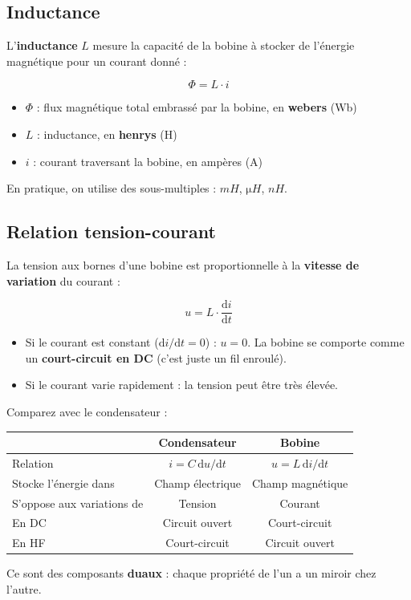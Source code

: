 \documentclass[12pt,a4paper,twoside]{book}
\begin{document}
\subsection{Inductance}

L'\textbf{inductance} $L$ mesure la capacité de la bobine à stocker de l'énergie magnétique pour un courant donné :

\begin{formule}
\[
\boxed{\Phi = L \cdot i}
\]
\begin{itemize}[nosep]
\item $\Phi$ : flux magnétique total embrassé par la bobine, en \textbf{webers} (Wb)
\item $L$ : inductance, en \textbf{henrys} (H)
\item $i$ : courant traversant la bobine, en ampères (A)
\end{itemize}
\vspace{0.2cm}
En pratique, on utilise des sous-multiples : $\si{mH}$, $\si{\micro H}$, $\si{nH}$.
\end{formule}

\subsection{Relation tension-courant}

La tension aux bornes d'une bobine est proportionnelle à la \textbf{vitesse de variation} du courant :

\begin{formule}
\[
\boxed{u = L \cdot \frac{\mathrm{d}i}{\mathrm{d}t}}
\]
\begin{itemize}[nosep]
\item Si le courant est constant ($\mathrm{d}i/\mathrm{d}t = 0$) : $u = 0$. La bobine se comporte comme un \textbf{court-circuit en DC} (c'est juste un fil enroulé).
\item Si le courant varie rapidement : la tension peut être très élevée.
\end{itemize}
\end{formule}

\begin{intuition}
Comparez avec le condensateur :
\begin{center}
\begin{tabular}{lcc}
\toprule
 & \textbf{Condensateur} & \textbf{Bobine} \\
\midrule
Relation & $i = C\,\mathrm{d}u/\mathrm{d}t$ & $u = L\,\mathrm{d}i/\mathrm{d}t$ \\
Stocke l'énergie dans & Champ électrique & Champ magnétique \\
S'oppose aux variations de & Tension & Courant \\
En DC & Circuit ouvert & Court-circuit \\
En HF & Court-circuit & Circuit ouvert \\
\bottomrule
\end{tabular}
\end{center}
Ce sont des composants \textbf{duaux} : chaque propriété de l'un a un miroir chez l'autre.
\end{intuition}
\end{document}
